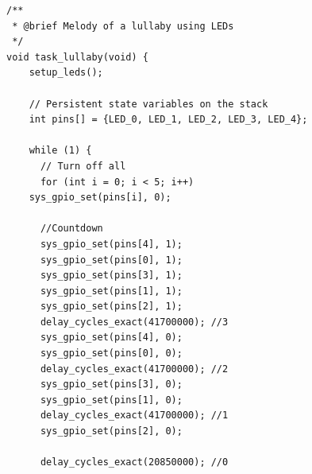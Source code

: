 \documentclass[12pt,letterpaper]{article}
\begin{document}
\begin{lstlisting}[style=modernc, caption={Algoritmo para \texttt{task\_lullaby} en \texttt{user\_app.c}}]
/**
 * @brief Melody of a lullaby using LEDs
 */
void task_lullaby(void) {
    setup_leds();

    // Persistent state variables on the stack
    int pins[] = {LED_0, LED_1, LED_2, LED_3, LED_4};

    while (1) {
      // Turn off all
      for (int i = 0; i < 5; i++)
	sys_gpio_set(pins[i], 0);

      //Countdown
      sys_gpio_set(pins[4], 1);
      sys_gpio_set(pins[0], 1);
      sys_gpio_set(pins[3], 1);
      sys_gpio_set(pins[1], 1);
      sys_gpio_set(pins[2], 1);
      delay_cycles_exact(41700000); //3
      sys_gpio_set(pins[4], 0);
      sys_gpio_set(pins[0], 0);
      delay_cycles_exact(41700000); //2
      sys_gpio_set(pins[3], 0);
      sys_gpio_set(pins[1], 0);
      delay_cycles_exact(41700000); //1
      sys_gpio_set(pins[2], 0);

      delay_cycles_exact(20850000); //0


\end{lstlisting}
\end{document}
